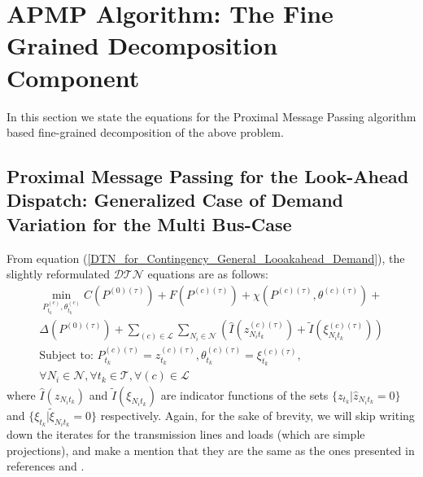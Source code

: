 \documentclass[preprint,12pt,3p]{elsarticle}
\begin{document}
\section{APMP Algorithm: The Fine Grained Decomposition Component}
\label{PMPAlgorithm}
In this section we state the equations for the Proximal Message Passing algorithm based fine-grained decomposition of the above problem.
\subsection{Proximal Message Passing for the Look-Ahead Dispatch: Generalized Case of Demand Variation for the Multi Bus-Case}
From equation (\ref{DTN_for_Contingency_General_Looakahead_Demand}), the slightly reformulated $\mathcal{DTN}$ equations are as follows:
\begin{equation}\label{DTN_Reform_Demand_Var_General}
\begin{array}{ll}
\min_{P_{t_k}^{(c)},\theta_{t_k}^{(c)}}C(P^{(0)(\tau)})
+F(P^{(c)(\tau)})+\chi(P^{(c)(\tau)},\theta^{(c)(\tau)})+\\\Delta(P^{(0)(\tau)})+\sum_{(c)\in\mathcal{L}}\sum_{{N_i}\in\mathcal{N}}(\hat{I}(z_{{N_i}{t_k}}^{(c)(\tau)})+\tilde{I}(\xi_{{N_i}{t_k}}^{(c)(\tau)}))\\
\text{Subject to: }P_{t_k}^{(c)(\tau)}=z_{t_k}^{(c)(\tau)}, {\theta}_{t_k}^{(c)(\tau)}=\xi_{t_k}^{(c)(\tau)},\\ \forall N_i\in\mathcal{N}, \forall t_k\in\mathcal{T},
\forall (c)\in\mathcal{L}
\end{array}
\end{equation}
where $\hat{I}(z_{{N_i}{t_k}})$ and $\tilde{I}(\xi_{{N_i}{t_k}})$ are indicator functions of the sets $\{z_{t_k}|\hat{z}_{{N_i}{t_k}}=0\}$ and $\{\xi_{t_k}|\tilde{\xi}_{{N_i}{t_k}}=0\}$ respectively. Again, for the sake of brevity, we will skip writing down the iterates for the transmission lines and loads (which are simple projections), and make a mention that they are the same as the ones presented in references \cite{CK:14} and \cite{Sambuddha2017}.
\end{document}
